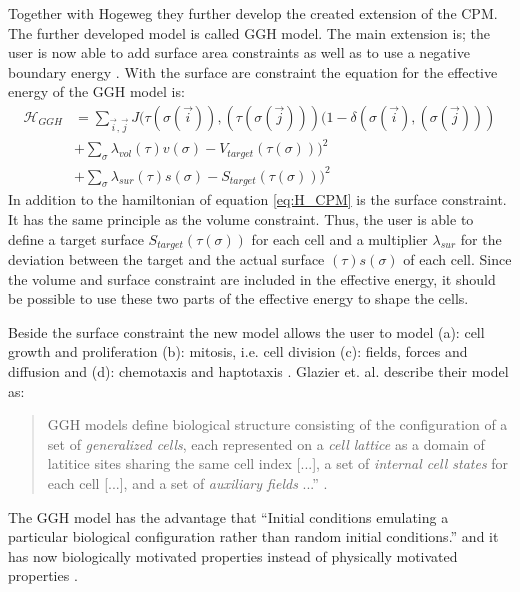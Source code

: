 Together with Hogeweg they further develop the created extension of the \ac{CPM}. The further developed model is called \ac{GGH} model. The main extension is; the user is now able to add surface area constraints \cite{Graner1992, Glazier1993, Glazier2007} as well as to use a negative boundary energy \cite{Glazier2007}. With the surface are constraint the equation for the effective energy of the \ac{GGH} model is: 
\begin{equation}\label{eq:H_GGH}
\begin{split}
\mathcal{H}_{GGH} & = \sum_{\vec{i},\vec{j}}^{ }J(\tau(\sigma(\vec{i})),(\tau(\sigma(\vec{j})))(1-\delta(\sigma(\vec{i}),(\sigma(\vec{j}))) \\
		 & + \sum_{\sigma}^{}{\lambda_{vol}(\tau)v(\sigma)-V_{target}(\tau(\sigma)))^2} \\
		 & + \sum_{\sigma}^{}{\lambda_{sur}(\tau)s(\sigma)-S_{target}(\tau(\sigma)))^2}
\end{split}
\end{equation}
In addition to the hamiltonian of equation \ref{eq:H_CPM} is the surface constraint. It has the same principle as the volume constraint. Thus, the user is able to define a target surface $S_{target}(\tau(\sigma))$ for each cell and a multiplier $\lambda_{sur}$ for the deviation between the target and the actual surface $(\tau)s(\sigma)$ of each cell. Since the volume and surface constraint are included in the effective energy, it should be possible to use these two parts of the effective energy to shape the cells.


Beside the surface constraint the new model allows the user to model (a): cell growth and proliferation (b): mitosis, i.e. cell division (c): fields, forces and diffusion and (d): chemotaxis and haptotaxis \cite{Glazier2007}. \newline
Glazier et. al. describe their model as: 
\begin{quote}
GGH models define biological structure consisting of the configuration of a set of \textit{generalized cells}, each represented on a \textit{cell lattice} as a domain of latitice sites sharing the same cell index [...], a set of \textit{internal cell states} for each cell [...], and a set of \textit{auxiliary fields} ...” \cite{Glazier2007}.
\end{quote}

The \ac{GGH} model has the advantage that “Initial conditions emulating a particular biological configuration rather than random initial conditions.” \cite{Glazier2007} and it has now biologically motivated properties instead of physically motivated properties \cite{Glazier2007}. 


